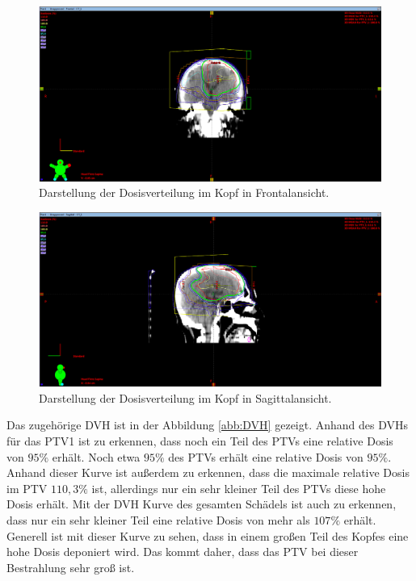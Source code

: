 \begin{figure}[H]
  \centering
  \includegraphics[width=\textwidth]{Bilder/Teilhirn1_Y.png}
  \caption{Darstellung der Dosisverteilung im Kopf in Frontalansicht.}
  \label{abb:Y}
\end{figure}

\begin{figure}[H]
  \centering
  \includegraphics[width=\textwidth]{Bilder/Teilhirn1_X.png}
  \caption{Darstellung der Dosisverteilung im Kopf in Sagittalansicht.}
  \label{abb:X}
\end{figure}

Das zugehörige DVH ist in der Abbildung \ref{abb:DVH} gezeigt. Anhand des DVHs für das PTV1 ist zu erkennen, dass noch ein Teil des PTVs
eine relative Dosis von $95\%$ erhält. Noch etwa $95\%$ des PTVs erhält eine relative Dosis von $95\%$. Anhand dieser Kurve ist außerdem
zu erkennen, dass die maximale relative Dosis im PTV $110,3\%$ ist, allerdings nur ein sehr kleiner Teil des PTVs diese hohe Dosis erhält.
Mit der DVH Kurve des gesamten Schädels ist auch zu erkennen, dass nur ein sehr kleiner Teil eine relative Dosis von mehr als $107\%$ erhält.
Generell ist mit dieser Kurve zu sehen, dass in einem großen Teil des Kopfes eine hohe Dosis deponiert wird. Das kommt daher, dass das PTV bei dieser
Bestrahlung sehr groß ist.



